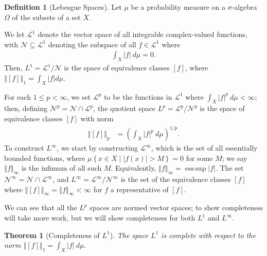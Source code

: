 \documentclass[10pt]{extarticle}
\newcommand{\norm}[1]{\left\Vert #1\right\Vert}
\newcommand{\set}[1]{\left\{#1\right\}}
\DeclareMathOperator*{\esssup}{ess\,sup}
\theoremstyle{plain}
\newtheorem*{theorem}{Theorem}
\theoremstyle{definition}
\newtheorem*{definition}{Definition}
\theoremstyle{note}
\renewcommand{\newline}{\hfill\break}
\begin{document}
\begin{definition}[Lebesgue Spaces]
  Let $\mu$ be a probability measure on a $\sigma$-algebra $\Omega$ of the subsets of a set $X$.\newline

  We let $\mathcal{L}^{1}$ denote the vector space of all integrable complex-valued functions, with $\mathcal{N}\subseteq \mathcal{L}^{1}$ denoting the subspace of all $f\in \mathcal{L}^{1}$ where
  \begin{align*}
    \int_{X}^{} \left\vert f \right\vert\:d\mu = 0.
  \end{align*}
  Then, $L^{1} = \mathcal{L}^{1}/\mathcal{N}$ is the space of equivalence classes $[f]$, where $\norm{[f]}_{1} = \int_{X}|f|d\mu$.\newline

  For each $1 \leq p < \infty$, we set $\mathcal{L}^{p}$ to be the functions in $\mathcal{L}^{1}$ where $\int_{X}|f|^{p}\:d\mu < \infty$; then, defining $\mathcal{N}^{p} = \mathcal{N}\cap \mathcal{L}^{p}$, the quotient space $L^{p} = \mathcal{L}^{p}/\mathcal{N}^{p}$ is the space of equivalence classes $[f]$ with norm
  \begin{align*}
    \norm{[f]}_{p} &= \left(\int_{X}^{} |f|^{p}\:d\mu\right)^{1/p}.
  \end{align*}
  To construct $L^{\infty}$, we start by constructing $\mathcal{L}^{\infty}$, which is the set of all essentially bounded functions, where $\mu\set{x\in X\mid |f(x)| > M} = 0$ for some $M$; we say $\norm{f}_{\infty}$ is the infimum of all such $M$. Equivalently, $\norm{f}_{\infty} = \esssup |f|$. The set $\mathcal{N}^{\infty} = \mathcal{N}\cap \mathcal{L}^{\infty}$, and $L^{\infty} = \mathcal{L}^{\infty}/\mathcal{N}^{\infty}$ is the set of the equivalence classes $[f]$ where $\norm{[f]}_{\infty} = \norm{f}_{\infty} < \infty$ for $f$ a representative of $[f]$.\newline

  We can see that all the $L^{p}$ spaces are normed vector spaces; to show completeness will take more work, but we will show completeness for both $L^{1}$ and $L^{\infty}$.
\end{definition}
\begin{theorem}[Completeness of $L^{1}$]
  The space $L^{1}$ is complete with respect to the norm $\norm{[f]}_1 = \int_{X}|f|\:d\mu$.
\end{theorem}
\end{document}
